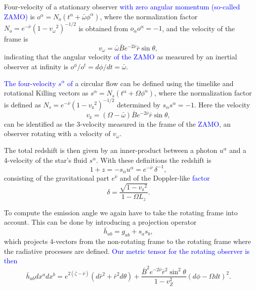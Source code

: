 \documentclass{aa}
\newcommand{\be}{\begin{equation}}
\newcommand{\ee}{\end{equation}}
\newcommand{\refe}[1]{\textcolor{blue}{{#1}}}
\newcommand{\rb}{\ensuremath{\bar{r}}}
\newcommand{\wb}{\ensuremath{\bar{\omega}}}
\newcommand{\nub}{\ensuremath{\bar{\nu}}}
\newcommand{\zetab}{\ensuremath{\bar{\zeta}}}
\newcommand{\Bb}{\ensuremath{\bar{B}}}
\newcommand{\vw}{\ensuremath{v_{\omega}}}
\newcommand{\vz}{\ensuremath{v_{\mathrm{z}}}}
\begin{document}
Four-velocity of a stationary observer \refe{with zero angular momentum (so-called ZAMO)} is $o^{\alpha} = N_o (t^{\alpha} + \wb \phi^{\alpha})$, where the normalization factor $N_o = e^{-\nub}(1-\vw^2)^{-1/2}$ is obtained from $o_{\alpha}o^{\alpha} = -1$, and the velocity of the frame is 
\be
\vw = \wb \Bb e^{-2\nub} \rb \sin\theta,
\ee
indicating that the angular velocity \refe{of the ZAMO} as measured by an inertial observer at infinity is $o^{\phi} / o^{t} = d\phi/dt = \wb$.

\refe{The four-velocity $s^{\alpha}$ of} a circular flow can be defined using the timelike and rotational Killing vectors as $s^{\alpha} = N_s (t^{\alpha} + \Omega \phi^{\alpha})$, where the normalization factor is defined as $N_s = e^{-\nub} (1 - \vz^2)^{-1/2}$ determined by $s_{\alpha}s^{\alpha} = -1$.
Here the velocity 
\be
\vz = (\Omega - \wb) \Bb e^{-2\nub} \rb \sin\theta,
\ee
can be identified as the 3-velocity measured in the frame of the \refe{ZAMO}, an observer rotating with a velocity of $\vw$.

The total redshift is then given by an inner-product between a photon $u^{\alpha}$ and a 4-velocity of the star's fluid $s^{\alpha}$.
With these definitions the redshift is
\be\label{eq:redshift}
1 + z = -s_{\alpha} u^{\alpha} = e^{-\nub} ~\delta^{-1},
\ee
consisting of the gravitational part $e^{\nub}$ and of the Doppler-like \refe{factor}
\be
\delta = \frac{\sqrt{1-\vz^2}}{1 - \Omega L_z}.
\ee

To compute the emission angle we again have to take the rotating frame into account.  
This can be done by introducing a projection operator 
\be
\bar{h}_{ab} = g_{ab} + s_a s_b, 
\ee
which projects 4-vectors from the non-rotating frame to the rotating frame where the radiative processes are defined.  
\refe{Our metric tensor for the rotating observer is then}
\be\label{eq:proj}
\bar{h}_{ab} dx^a dx^b = e^{2(\zetab - \nub)} (d\rb^2 + \rb^2 d\theta) + \frac{\Bb^2 e^{-2\nub} \rb^2 \sin^2\theta}{1-v_Z^2} (d\phi - \Omega dt)^2.
\ee
\end{document}
